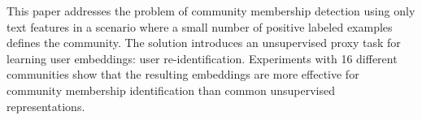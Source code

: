 This paper addresses the problem of community membership detection using only text features in a scenario where a small number of positive labeled examples defines the community. The solution introduces an unsupervised proxy task for learning user embeddings: user re-identification. Experiments with 16 different communities show that the resulting embeddings are more effective for community membership identification than common unsupervised representations.
